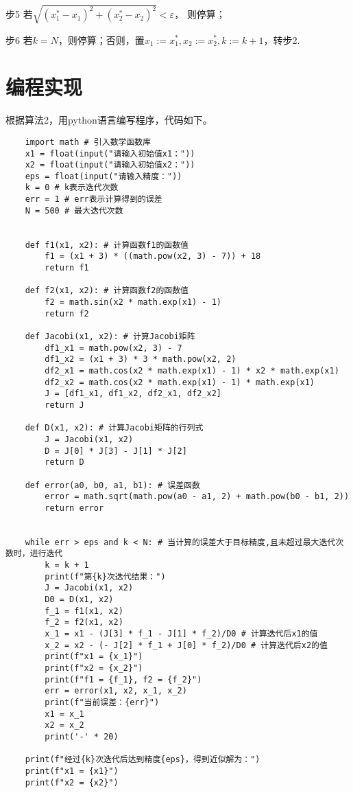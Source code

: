 \documentclass[UTF8,a4paper,12pt]{ctexart}
\begin{document}
   步5 \; 若$\sqrt{(x_1^*-x_1)^2+(x_2^*-x_2)^2}<\varepsilon$，
   则停算；
   
   步6 \; 若$k=N$，则停算；否则，置$x_1:=x_1^*,x_2:=x_2^*,k:=k+1$，转步2.
	
 \section{编程实现}
 根据算法2，用python语言编写程序，代码如下。
 \begin{lstlisting}
    import math # 引入数学函数库
    x1 = float(input("请输入初始值x1："))
    x2 = float(input("请输入初始值x2："))
    eps = float(input("请输入精度："))
    k = 0 # k表示迭代次数
    err = 1 # err表示计算得到的误差
    N = 500 # 最大迭代次数
    
    
    def f1(x1, x2): # 计算函数f1的函数值
        f1 = (x1 + 3) * ((math.pow(x2, 3) - 7)) + 18
        return f1
    
    def f2(x1, x2): # 计算函数f2的函数值
        f2 = math.sin(x2 * math.exp(x1) - 1)
        return f2
    
    def Jacobi(x1, x2): # 计算Jacobi矩阵
        df1_x1 = math.pow(x2, 3) - 7
        df1_x2 = (x1 + 3) * 3 * math.pow(x2, 2)
        df2_x1 = math.cos(x2 * math.exp(x1) - 1) * x2 * math.exp(x1)
        df2_x2 = math.cos(x2 * math.exp(x1) - 1) * math.exp(x1)
        J = [df1_x1, df1_x2, df2_x1, df2_x2]
        return J
    
    def D(x1, x2): # 计算Jacobi矩阵的行列式
        J = Jacobi(x1, x2)
        D = J[0] * J[3] - J[1] * J[2]
        return D
    
    def error(a0, b0, a1, b1): # 误差函数
        error = math.sqrt(math.pow(a0 - a1, 2) + math.pow(b0 - b1, 2))
        return error
    
    
    while err > eps and k < N: # 当计算的误差大于目标精度,且未超过最大迭代次数时，进行迭代
        k = k + 1 
        print(f"第{k}次迭代结果：")
        J = Jacobi(x1, x2)
        D0 = D(x1, x2)
        f_1 = f1(x1, x2)
        f_2 = f2(x1, x2)
        x_1 = x1 - (J[3] * f_1 - J[1] * f_2)/D0 # 计算迭代后x1的值
        x_2 = x2 - (- J[2] * f_1 + J[0] * f_2)/D0 # 计算迭代后x2的值
        print(f"x1 = {x_1}")
        print(f"x2 = {x_2}")
        print(f"f1 = {f_1}, f2 = {f_2}")
        err = error(x1, x2, x_1, x_2)
        print(f"当前误差：{err}")
        x1 = x_1
        x2 = x_2
        print('-' * 20)
    
    print(f"经过{k}次迭代后达到精度{eps}，得到近似解为：")
    print(f"x1 = {x1}")
    print(f"x2 = {x2}")
\end{lstlisting}
 
\end{document}
